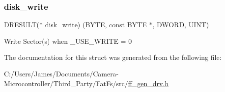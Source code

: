 \subsubsection{\texorpdfstring{disk\+\_\+write}{disk\_write}}
{\footnotesize\ttfamily D\+R\+E\+S\+U\+LT($\ast$ disk\+\_\+write) (B\+Y\+TE, const B\+Y\+TE $\ast$, D\+W\+O\+RD, U\+I\+NT)}

Write Sector(s) when \+\_\+\+U\+S\+E\+\_\+\+W\+R\+I\+TE = 0 

The documentation for this struct was generated from the following file\+:\begin{DoxyCompactItemize}
\item 
C\+:/\+Users/\+James/\+Documents/\+Camera-\/\+Microcontroller/\+Third\+\_\+\+Party/\+Fat\+Fs/src/\hyperlink{ff__gen__drv_8h}{ff\+\_\+gen\+\_\+drv.\+h}\end{DoxyCompactItemize}
